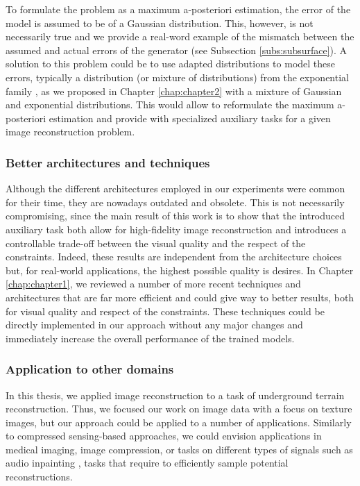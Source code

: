 To formulate the problem as a maximum a-posteriori estimation, the error of the model is assumed to be of a Gaussian distribution. This, however, is not necessarily true and we provide a real-word example of the mismatch between the assumed and actual errors of the generator (see Subsection \ref{subs:subsurface}). A solution to this problem could be to use adapted distributions to model these errors, typically a distribution (or mixture of distributions) from the exponential family \citep{Brown1986}, as we proposed in Chapter \ref{chap:chapter2} with a mixture of Gaussian and exponential distributions. This would allow to reformulate the maximum a-posteriori estimation and provide with specialized auxiliary tasks for a given image reconstruction problem.

\subsubsection*{Better architectures and techniques}

Although the different architectures employed in our experiments were common for their time, they are nowadays outdated and obsolete. This is not necessarily compromising, since the main result of this work is to show that the introduced auxiliary task both allow for high-fidelity image reconstruction and introduces a controllable trade-off between the visual quality and the respect of the constraints. Indeed, these results are independent from the architecture choices but, for real-world applications, the highest possible quality is desires. In Chapter \ref{chap:chapter1}, we reviewed a number of more recent techniques and architectures that are far more efficient and could give way to better results, both for visual quality and respect of the constraints. These techniques could be directly implemented in our approach without any major changes and immediately increase the overall performance of the trained models.

\subsubsection*{Application to other domains}

In this thesis, we applied image reconstruction to a task of underground terrain reconstruction. Thus, we focused our work on image data with a focus on texture images, but our approach could be applied to a number of applications. Similarly to compressed sensing-based approaches, we could envision applications in medical imaging, image compression, or tasks on different types of signals such as audio inpainting \citep{Marafioti2018}, tasks that require to efficiently sample potential reconstructions.

